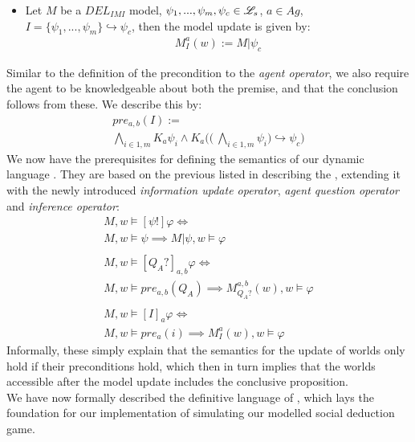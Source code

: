 \begin{itemize}
    \item Let $M$ be a $DEL_{IMI}$ model, $\psi_1,...,\psi_m, \psi_c \in \mathscr{L}_s$,
          $a\in Ag$, $I=\{\psi_1,...,\psi_m\} \hookrightarrow \psi_c$, then the model
          update is given by:
          \begin{gather}
              M^a_I(w) := M|\psi_c
          \end{gather}
\end{itemize}
Similar to the definition of the precondition to the \textit{agent operator}, we also require the agent to be knowledgeable about both the premise, and that the conclusion follows from these. We describe this by:
\begin{gather}
\nonumber pre_{a,b}(I) := \\ \bigwedge\limits_{i\in1,m}K_a\psi_i \land K_a\Biggl(\Biggl(\:\bigwedge\limits_{i\in 1,m}\psi_i\Biggr) \hookrightarrow \psi_c \Biggr)
\end{gather}
We now have the prerequisites for defining the semantics of our dynamic language \dynlang. They are based on the previous listed in  describing the \staticlang, extending it with the newly introduced \textit{information update operator}, \textit{agent question operator} and \textit{inference operator}:
\begin{equation}
\begin{gathered}
    M, w \models [\psi!]\varphi \iff \\ 
    M, w \models \psi \implies M|\psi, w \models \varphi \\\\
    M, w \models [Q_A?]_{a,b}\varphi \iff \\ 
    M, w \models pre_{a,b}(Q_A) \implies M^{a,b}_{Q_A?}(w), w \models \varphi 
    \\\\
    M, w \models [I]_a\varphi \iff \\ 
    M, w \models pre_a(i) \implies M^a_I(w), w \models \varphi
\end{gathered}
\end{equation}
Informally, these simply explain that the semantics for the update of worlds only hold if their preconditions hold, which then in turn implies that the worlds accessible after the model update includes the conclusive proposition. \\

We have now formally described the definitive language of \dynlang, which lays
the foundation for our implementation of simulating our modelled social
deduction game.